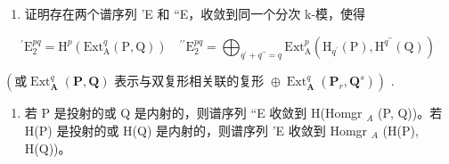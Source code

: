 \begin{enumerate}
\def\labelenumi{\alph{enumi})}
\tightlist
\item
  证明存在两个谱序列 'E 和 ``E，收敛到同一个分次 k-模，使得
\end{enumerate}

\[
^ {\prime} \mathrm{E} _ {2} ^ {p q} = \mathrm{H} ^ {p} (\mathrm{Ext} _ {\mathrm{A}} ^ {q} (\mathrm{P}, \mathrm{Q})) \quad^ {\prime \prime} \mathrm{E} _ {2} ^ {p q} = \bigoplus_ {q ^ {\prime} + q ^ {\prime \prime} = q} \mathrm{Ext} _ {\mathrm{A}} ^ {p} (\mathrm{H} _ {q ^ {\prime}} (\mathrm{P}), \mathrm{H} ^ {q ^ {\prime \prime}} (\mathrm{Q}))
\]

\((\text{或} \operatorname{Ext}_{\mathbf{A}}^{q}(\mathbf{P}, \mathbf{Q}) \text{ 表示与双复形相关联的复形 } \oplus \operatorname{Ext}_{\mathbf{A}}^{q}(\mathbf{P}_{r}, \mathbf{Q}^{s}))\) .

\begin{enumerate}
\def\labelenumi{\alph{enumi})}
\setcounter{enumi}{1}
\tightlist
\item
  若 P 是投射的或 Q 是内射的，则谱序列 ``E 收敛到 H(Homgr \(_A\) (P, Q))。若 H(P) 是投射的或 H(Q) 是内射的，则谱序列 'E 收敛到 Homgr \(_A\) (H(P), H(Q))。
\end{enumerate}

